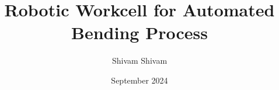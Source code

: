 \documentclass[12pt,a4paper,final]{report}
\begin{document}


\title{Robotic Workcell for Automated Bending Process}

\author{Shivam Shivam}

\date{September 2024}



\tableofcontents
\listoffigures
\listoftables



\newpage
\setcounter{page}{1}



















\setcounter{page}{0}

\printbibliography

\end{document}

